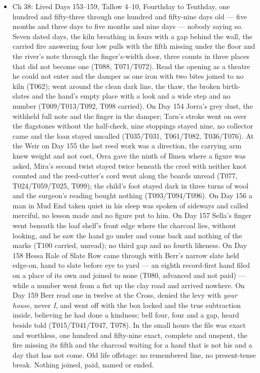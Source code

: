 \documentclass{design/chronicle}
\begin{document}
{\begin{itemize}[leftmargin=1.4em,itemsep=1pt,topsep=3pt,parsep=0pt]
\end{itemize}

\begin{itemize}[leftmargin=1.4em,itemsep=1pt,topsep=3pt,parsep=0pt]

\item Ch 38: Lived Days 153–159, Tallow 4–10, Fourthday to Tenthday, one hundred and fifty-three through one hundred and fifty-nine days old — five months and three days to five months and nine days — nobody saying so. Seven dated days, the kiln breathing in fours with a gap behind the wall, the carried fire answering four low pulls with the fifth missing under the floor and the river’s note through the finger’s-width door, three counts in three places that did not become one (T088, T071/T072). Read the opening as a theatre he could not enter and the damper as one iron with two bites joined to no kiln (T062); went around the clean dark line, the thaw, the broken birth-slates and the hand’s empty place with a look and a wide step and no number (T009/T013/T092, T098 carried). On Day 154 Jorra’s grey dust, the withheld full note and the finger in the damper; Tarn’s stroke went on over the flagstones without the half-check, nine stoppings stayed nine, no collector came and the loan stayed uncalled (T035/T031, T061/T082, T036/T076). At the Weir on Day 155 the last reed work was a direction, the carrying arm knew weight and not cost, Orra gave the ninth of Ilmen where a figure was asked, Mira’s second twist stayed twice beneath the creel with neither knot counted and the reed-cutter’s cord went along the boards unread (T077, T024/T059/T025, T099); the child’s foot stayed dark in three turns of wool and the surgeon’s reading bought nothing (T093/T094/T096). On Day 156 a man in Mud End taken quiet in his sleep was spoken of sideways and called merciful, no lesson made and no figure put to him. On Day 157 Sella’s finger went beneath the loaf shelf’s front edge where the charcoal lies, without looking, and he saw the hand go under and come back and nothing of the marks (T100 carried, unread); no third gap and no fourth likeness. On Day 158 Hessa Rale of Slate Row came through with Berr’s narrow slate held edge-on, hand to slate before eye to yard — an eighth record-first hand filed on a place of its own and joined to none (T080, advanced and not paid) — while a number went from a fist up the clay road and arrived nowhere. On Day 159 Berr read one in twelve at the Cross, denied the levy with \emph{your house}, never \emph{I}, and went off with the box locked and the true subtraction inside, believing he had done a kindness; bell four, four and a gap, heard beside told (T015/T041/T047, T078). In the small hours the file was exact and worthless, one hundred and fifty-nine exact, complete and unspent, the fire missing its fifth and the charcoal waiting for a hand that is not his and a day that has not come. Old life offstage: no remembered line, no present-tense break. Nothing joined, paid, named or ended.


\end{itemize}}
\end{document}
